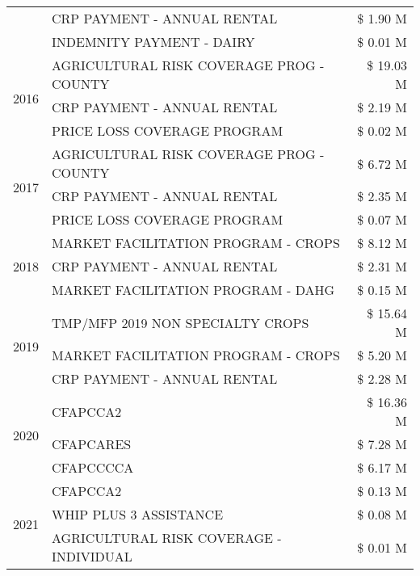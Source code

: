 \begin{tabular}{llr}
 & CRP PAYMENT - ANNUAL RENTAL & \$ 1.90 M \\
 & INDEMNITY PAYMENT - DAIRY & \$ 0.01 M \\
\cline{1-3}
\multirow[t]{3}{*}{2016} & AGRICULTURAL RISK COVERAGE PROG - COUNTY & \$ 19.03 M \\
 & CRP PAYMENT - ANNUAL RENTAL & \$ 2.19 M \\
 & PRICE LOSS COVERAGE PROGRAM & \$ 0.02 M \\
\cline{1-3}
\multirow[t]{3}{*}{2017} & AGRICULTURAL RISK COVERAGE PROG - COUNTY & \$ 6.72 M \\
 & CRP PAYMENT - ANNUAL RENTAL & \$ 2.35 M \\
 & PRICE LOSS COVERAGE PROGRAM & \$ 0.07 M \\
\cline{1-3}
\multirow[t]{3}{*}{2018} & MARKET FACILITATION PROGRAM - CROPS & \$ 8.12 M \\
 & CRP PAYMENT - ANNUAL RENTAL & \$ 2.31 M \\
 & MARKET FACILITATION PROGRAM - DAHG & \$ 0.15 M \\
\cline{1-3}
\multirow[t]{3}{*}{2019} & TMP/MFP 2019 NON SPECIALTY CROPS & \$ 15.64 M \\
 & MARKET FACILITATION PROGRAM - CROPS & \$ 5.20 M \\
 & CRP PAYMENT - ANNUAL RENTAL & \$ 2.28 M \\
\cline{1-3}
\multirow[t]{3}{*}{2020} & CFAPCCA2 & \$ 16.36 M \\
 & CFAPCARES & \$ 7.28 M \\
 & CFAPCCCCA & \$ 6.17 M \\
\cline{1-3}
\multirow[t]{3}{*}{2021} & CFAPCCA2 & \$ 0.13 M \\
 & WHIP PLUS 3 ASSISTANCE & \$ 0.08 M \\
 & AGRICULTURAL RISK COVERAGE - INDIVIDUAL & \$ 0.01 M \\
\cline{1-3}
\bottomrule
\end{tabular}
